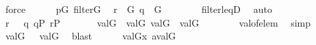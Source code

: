 \begin{isabellebody}
\ force\isanewline
\ \ \ \ \isamarkupfalse%
\ {\isacartoucheopen}p{\isasymin}G{\isacartoucheclose}\ {\isacartoucheopen}filter{\isacharparenleft}{\kern0pt}G{\isacharparenright}{\kern0pt}{\isacartoucheclose}\ \isamarkupfalse%
\ {\isachardoublequoteopen}r\ {\isasymin}\ G{\isachardoublequoteclose}\ {\isachardoublequoteopen}q\ {\isasymin}\ G{\isachardoublequoteclose}\isanewline
\ \ \ \ \ \ \isamarkupfalse%
\ filter{\isacharunderscore}{\kern0pt}leqD\ \isamarkupfalse%
\ auto\isanewline
\ \ \ \ \isamarkupfalse%
\ {\isacartoucheopen}{\isasymlangle}{\isasymtheta}{\isacharcomma}{\kern0pt}r{\isasymrangle}\ {\isasymin}\ {\isasymsigma}{\isacartoucheclose}\ {\isacartoucheopen}{\isasymlangle}{\isasymsigma}{\isacharcomma}{\kern0pt}q{\isasymrangle}{\isasymin}{\isasymtau}{\isacartoucheclose}\ {\isacartoucheopen}q{\isasymin}P{\isacartoucheclose}\ {\isacartoucheopen}r{\isasymin}P{\isacartoucheclose}\ \isamarkupfalse%
\isanewline
\ \ \ \ \ \ {\isachardoublequoteopen}val{\isacharparenleft}{\kern0pt}G{\isacharcomma}{\kern0pt}{\isasymsigma}{\isacharparenright}{\kern0pt}\ {\isasymin}\ val{\isacharparenleft}{\kern0pt}G{\isacharcomma}{\kern0pt}{\isasymtau}{\isacharparenright}{\kern0pt}{\isachardoublequoteclose}\ {\isachardoublequoteopen}val{\isacharparenleft}{\kern0pt}G{\isacharcomma}{\kern0pt}{\isasymtheta}{\isacharparenright}{\kern0pt}\ {\isasymin}\ val{\isacharparenleft}{\kern0pt}G{\isacharcomma}{\kern0pt}{\isasymsigma}{\isacharparenright}{\kern0pt}{\isachardoublequoteclose}\isanewline
\ \ \ \ \ \ \isamarkupfalse%
\ val{\isacharunderscore}{\kern0pt}of{\isacharunderscore}{\kern0pt}elem\ \isamarkupfalse%
\ simp{\isacharplus}{\kern0pt}\isanewline
\ \ \ \ \isamarkupfalse%
\ \isamarkupfalse%
\ {\isachardoublequoteopen}val{\isacharparenleft}{\kern0pt}G{\isacharcomma}{\kern0pt}{\isasymtheta}{\isacharparenright}{\kern0pt}\ {\isasymin}\ {\isasymUnion}\ val{\isacharparenleft}{\kern0pt}G{\isacharcomma}{\kern0pt}{\isasymtau}{\isacharparenright}{\kern0pt}{\isachardoublequoteclose}\ \isamarkupfalse%
\ blast\isanewline
\ \ \ \ \isamarkupfalse%
\ {\isacartoucheopen}val{\isacharparenleft}{\kern0pt}G{\isacharcomma}{\kern0pt}{\isasymtheta}{\isacharparenright}{\kern0pt}{\isacharequal}{\kern0pt}x{\isacartoucheclose}\ {\isacartoucheopen}a{\isacharequal}{\kern0pt}val{\isacharparenleft}{\kern0pt}G{\isacharcomma}{\kern0pt}{\isasymtau}{\isacharparenright}{\kern0pt}{\isacartoucheclose}\ \isamarkupfalse%

\end{isabellebody}
